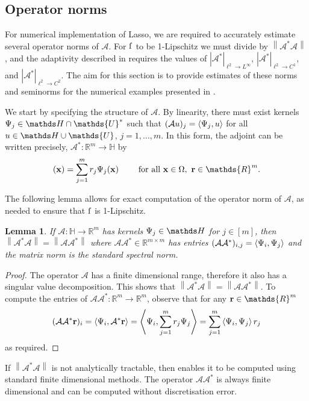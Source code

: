 \documentclass[10pt,a4paper,onecolumn]{article}
\numberwithin{equation}{section}
\newtheorem{lemma}{Lemma}[section]\newtheorem{example}{Example}[section]
\let\F\mathds\let\C\mathcal\newcommand{\R}{\F{R}}\newcommand{\A}{\C{A}}
\newcommand{\norm}[1]{{\left\lVert #1 \right\rVert}}
\newcommand{\IP}[2]{\left\langle #1,#2 \right\rangle}\newcommand{\ip}[2]{#1 \vcenter{\hbox{\resizebox{6pt}{!}{\ensuremath\cdot}}} #2}
\newcommand{\op}[1]{\operatorname{#1}}\newcommand{\overtext}[2]{\stackrel{\text{#1}}{#2}}
\renewcommand{\vec}{\mathbf}
\newcommand{\UCmath}[1]{%
	\begingroup
	\ucmathlist\uppercase\expandafter{#1}%
	\endgroup
}
\newcommand{\ucmathlist}{%
	\def\alpha{\mathrm{A}}%
	\def\beta{\mathrm{B}}%
	\let\gamma=\Gamma
	\let\delta=\Delta
	\def\epsilon{\mathrm{E}}%
	\def\varepsilon{\mathrm{E}}%
	\def\zeta{\mathrm{Z}}%
	\def\eta{\mathrm{H}}%
	\let\theta=\Theta
	\let\vartheta=\Theta
	\def\iota{\mathrm{I}}%
	\def\kappa{\mathrm{K}}%
	\let\lambda=\Lambda
	\def\mu{\mathrm{M}}%
	\def\nu{\mathrm{N}}%
	\let\xi=\Xi
	\let\pi=\Pi
	\let\varpi=\Pi
	\def\rho{\mathrm{P}}%
	\def\varrho{\mathrm{P}}%
	\let\sigma=\Sigma
	\def\tau{\mathrm{T}}%
	\let\upsilon=\Upsilon
	\let\phi=\Phi
	\let\varphi=\Phi
	\def\chi{\mathrm{X}}%
	\let\psi=\Psi
	\let\omega=\Omega
}
\newcommand{\caps}[1]{\UCmath{#1}}
\newcommand*{\func}[1]{%
	\IfEqCase{#1}{%
		{0}{\op{e}}%
		{1}{\op{f}}%
		{2}{\op{g}}%
		{3}{\op{h}}%
	}[\op{f}#1]%
}
\newcommand*{\varf}[1]{%
	\IfEqCase{#1}{%
		{0}{u}%
		{1}{v}%
		{2}{w}%
	}[u#1]%
}
\newcommand*{\spcf}[1]{%
	\IfEqCase{#1}{%
		{0}{\F{U}}%
		{1}{\F{V}}%
		{2}{\F{W}}%
	}[\F{U}#1]%
}
\newcommand*{\vard}[1]{%
	\IfEqCase{#1}{%
		{0}{\varphi}%
		{1}{\psi}%
	}[\varphi #1]%
}
\newcommand*{\varx}[1]{%
	\IfEqCase{#1}{%
		{0}{x}%
		{1}{y}%
		{2}{z}%
		{3}{r}%
	}[x#1]%
}
\newcommand{\Domain}{\Omega}
\newcommand*{\Varx}[1]{\caps{\varx{#1}}}
\newcommand*{\vvarx}[1]{\vec{\varx{#1}}}\newcommand*{\vVarx}[1]{\vec{\Varx{#1}}}
\begin{document}
\subsection{Operator norms}\label{sec: smoothing operators}
For numerical implementation of Lasso, we are required to accurately estimate several operator norms of $\A$. For $\func1$ to be 1-Lipschitz we must divide by $\norm{\A^*\A}$, and the adaptivity described in  requires the values of $|\A^*|_{\ell^2\to L^\infty}$, $|\A^*|_{\ell^2\to C^1}$, and $|\A^*|_{\ell^2\to C^2}$. The aim for this section is to provide estimates of these norms and seminorms for the numerical examples presented in .

We start by specifying the structure of $\A$. By linearity, there must exist kernels $\vard1_j\in \F H\cap\spcf0^*$ such that $(\A\varf0)_j = \IP{\vard1_j}{\varf0}$ for all $\varf0\in \F H\cup\spcf0$, $j=1,\ldots,m$. In this form, the adjoint can be written precisely, $\A^*\colon\R^m\to \F H$ by 
\begin{equation}
	[\A^*\vvarx3](\vvarx0) = \sum_{j=1}^m \varx3_j\vard1_j(\vvarx0) \qquad \text{ for all }\vvarx0\in\Domain,\ \vvarx3\in\R^m.
\end{equation}

The following lemma allows for exact computation of the operator norm of $\A$, as needed to ensure that $\func1$ is 1-Lipschitz.
\begin{lemma}\label{thm: norm bound L2}
	If $\A\colon \F H \to \R^m$ has kernels $\vard1_j\in \F H$ for $j\in[m]$, then
	$ \norm{\A^*\A} = \norm{\A\A^*} $
	where $\A\A^*\in\R^{m\times m}$ has entries $(\A\A^*)_{i,j} = \IP{\vard1_i}{\vard1_j}$
	and the matrix norm is the standard spectral norm.
\end{lemma}
\begin{proof}
	The operator $\A$ has a finite dimensional range, therefore it also has a singular value decomposition. This shows that $ \norm{\A^*\A} = \norm{\A\A^*} $. To compute the entries of $\A\A^*\colon\R^m\to\R^m$, observe that for any $\vvarx3\in\R^m$
	\begin{equation}
		(\A\A^*\vvarx3)_i = \IP{\vard1_i}{\A^*\vvarx3} = \IP{\vard1_i}{\sum_{j=1}^m\varx3_j\vard1_j} = \sum_{j=1}^m \IP{\vard1_i}{\vard1_j}\varx3_j
	\end{equation}
	as required.
\end{proof}
If $\norm{\A^*\A}$ is not analytically tractable, then  enables it to be computed using standard finite dimensional methods. The operator $\A\A^*$ is always finite dimensional and can be computed without discretisation error.
\end{document}
